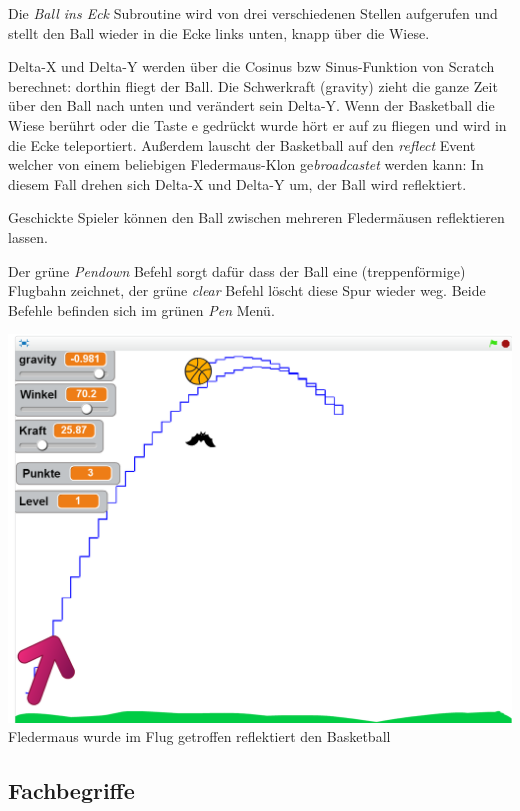 \documentclass[10pt,a4paper,ngerman,twoside]{article} %
\begin{document}
\begin{multicols}{3}
Die \textit{Ball ins Eck} Subroutine wird von drei verschiedenen Stellen aufgerufen und stellt den Ball wieder in die Ecke links unten, knapp über die Wiese.

Delta-X und Delta-Y werden über die Cosinus bzw Sinus-Funktion von Scratch berechnet: dorthin fliegt der Ball. Die Schwerkraft (gravity) zieht die ganze Zeit über den Ball nach unten und verändert sein Delta-Y. Wenn der Basketball die Wiese berührt oder die Taste e gedrückt wurde hört er auf zu fliegen und wird in die Ecke teleportiert. Außerdem lauscht der Basketball auf den \textit{reflect} Event welcher von einem beliebigen Fledermaus-Klon ge\textit{broadcastet} werden kann: In diesem Fall drehen sich Delta-X und Delta-Y um, der Ball wird reflektiert. 

Geschickte Spieler können den Ball zwischen mehreren Fledermäusen reflektieren lassen. 

Der grüne \textit{Pendown} Befehl sorgt dafür dass der Ball eine (treppenförmige) Flugbahn zeichnet, der grüne \textit{clear} Befehl löscht diese Spur wieder weg. Beide Befehle befinden sich im grünen \textit{Pen} Menü.

\begin{center}
\includegraphics[width=\linewidth]{scratch/final.png}
\footnotesize{Fledermaus wurde im Flug getroffen reflektiert den Basketball}
\end{center}


\subsection*{Fachbegriffe}


\end{multicols}
\end{document}
